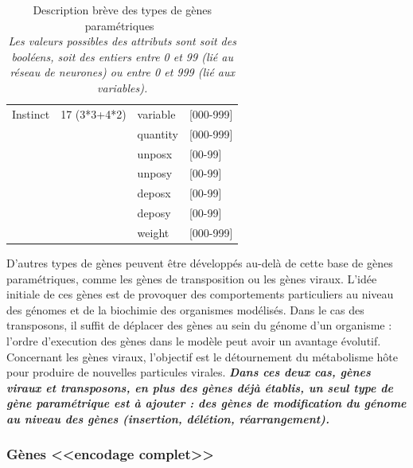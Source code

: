 \documentclass[11pt,twoside,a4paper]{article}
\begin{document}
\begin{table}[h]
\begin{center}
\begin{scriptsize}
\begin{tabular}{|p{}|c|p{}|p{}|}
	\hline \hline
	Instinct						&	17 (3*3+4*2)&	variable	& [000-999] \\
	\cline{3-4} %
								&				&	quantity	& [000-999] \\
	\cline{3-4} %
								&				&	unposx		& [00-99] \\
	\cline{3-4} %
								&				&	unposy		& [00-99] \\
	\cline{3-4} %
								&				&	deposx		& [00-99] \\
	\cline{3-4} %
								&				&	deposy		& [00-99] \\
	\cline{3-4} %
								&				&	weight		& [000-999] \\
	\hline \hline
	\end{tabular}
	\end{scriptsize} \end{center}
	\caption[Description br{\`e}ve des types de g{\`e}nes param{\'e}triques]
		{Description br{\`e}ve des types de g{\`e}nes param{\'e}triques~\\
		\emph{Les valeurs possibles des attributs sont soit des bool{\'e}ens, soit des entiers entre 0 et 99 (li{\'e} au r{\'e}seau de neurones) ou entre 0 et 999 (li{\'e} aux variables). }}
	\label{tab:briefDescriptionGeneTypes}
\end{table}

\clearpage

D'autres types de g{\`e}nes peuvent {\^e}tre d{\'e}velopp{\'e}s au-del{\`a} de cette base de g{\`e}nes param{\'e}triques, comme les g{\`e}nes de transposition ou les g{\`e}nes viraux. L'id{\'e}e initiale de ces g{\`e}nes est de provoquer des comportements particuliers au niveau des g{\'e}nomes et de la biochimie des organismes mod{\'e}lis{\'e}s. Dans le cas des transposons, il suffit de d{\'e}placer des g{\`e}nes au sein du g{\'e}nome d'un organisme : l'ordre d'execution des g{\`e}nes dans le mod{\`e}le peut avoir un avantage {\'e}volutif. Concernant les g{\`e}nes viraux, l'objectif est le d{\'e}tournement du m{\'e}tabolisme h{\^o}te pour produire de nouvelles particules virales. \emph{\textbf{Dans ces deux cas, g{\`e}nes viraux et transposons, en plus des g{\`e}nes d{\'e}j{\`a} {\'e}tablis, un seul type de g{\`e}ne param{\'e}trique est {\`a} ajouter : des g{\`e}nes de modification du g{\'e}nome au niveau des g{\`e}nes (insertion, d{\'e}l{\'e}tion, r{\'e}arrangement).}}~\\

\subsubsection{G{\`e}nes <<encodage complet>>}
\end{document}

